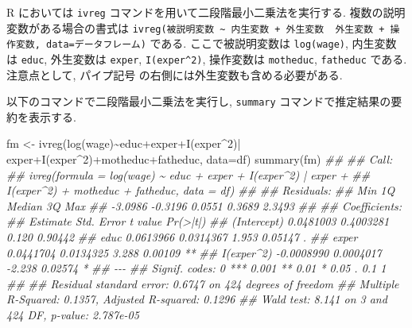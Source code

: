 \documentclass[
  letterpaper,
  xelatex,
  ja=standard, xelatex]{bxjsbook}
\newenvironment{Shaded}{\begin{snugshade}}{\end{snugshade}}
\newcommand{\AttributeTok}[1]{\textcolor[rgb]{0.40,0.45,0.13}{#1}}
\newcommand{\DecValTok}[1]{\textcolor[rgb]{0.68,0.00,0.00}{#1}}
\newcommand{\DocumentationTok}[1]{\textcolor[rgb]{0.37,0.37,0.37}{\textit{#1}}}
\newcommand{\FunctionTok}[1]{\textcolor[rgb]{0.28,0.35,0.67}{#1}}
\newcommand{\NormalTok}[1]{\textcolor[rgb]{0.00,0.23,0.31}{#1}}
\newcommand{\OtherTok}[1]{\textcolor[rgb]{0.00,0.23,0.31}{#1}}
\newcommand{\SpecialCharTok}[1]{\textcolor[rgb]{0.37,0.37,0.37}{#1}}
\begin{document}
R においては \texttt{ivreg} コマンドを用いて二段階最小二乗法を実行する.
複数の説明変数がある場合の書式は
\texttt{ivreg(被説明変数\ \textasciitilde{}\ 内生変数\ +\ 外生変数\ \textbar{}\ 外生変数\ +\ 操作変数,\ data=データフレーム)}
である. ここで被説明変数は \texttt{log(wage)}, 内生変数は \texttt{educ},
外生変数は \texttt{exper}, \texttt{I(exper\^{}2)}, 操作変数は
\texttt{motheduc}, \texttt{fatheduc} である. 注意点として, パイプ記号
\texttt{\textbar{}} の右側には外生変数も含める必要がある.

以下のコマンドで二段階最小二乗法を実行し, \texttt{summary}
コマンドで推定結果の要約を表示する.

\begin{Shaded}
\begin{Highlighting}[]
\NormalTok{fm  }\OtherTok{\textless{}{-}} \FunctionTok{ivreg}\NormalTok{(}\FunctionTok{log}\NormalTok{(wage)}\SpecialCharTok{\textasciitilde{}}\NormalTok{educ}\SpecialCharTok{+}\NormalTok{exper}\SpecialCharTok{+}\FunctionTok{I}\NormalTok{(exper}\SpecialCharTok{\^{}}\DecValTok{2}\NormalTok{)}\SpecialCharTok{|}
\NormalTok{            exper}\SpecialCharTok{+}\FunctionTok{I}\NormalTok{(exper}\SpecialCharTok{\^{}}\DecValTok{2}\NormalTok{)}\SpecialCharTok{+}\NormalTok{motheduc}\SpecialCharTok{+}\NormalTok{fatheduc,}
            \AttributeTok{data=}\NormalTok{df)}
\FunctionTok{summary}\NormalTok{(fm)}
\DocumentationTok{\#\# }
\DocumentationTok{\#\# Call:}
\DocumentationTok{\#\# ivreg(formula = log(wage) \textasciitilde{} educ + exper + I(exper\^{}2) | exper + }
\DocumentationTok{\#\#     I(exper\^{}2) + motheduc + fatheduc, data = df)}
\DocumentationTok{\#\# }
\DocumentationTok{\#\# Residuals:}
\DocumentationTok{\#\#     Min      1Q  Median      3Q     Max }
\DocumentationTok{\#\# {-}3.0986 {-}0.3196  0.0551  0.3689  2.3493 }
\DocumentationTok{\#\# }
\DocumentationTok{\#\# Coefficients:}
\DocumentationTok{\#\#               Estimate Std. Error t value Pr(\textgreater{}|t|)   }
\DocumentationTok{\#\# (Intercept)  0.0481003  0.4003281   0.120  0.90442   }
\DocumentationTok{\#\# educ         0.0613966  0.0314367   1.953  0.05147 . }
\DocumentationTok{\#\# exper        0.0441704  0.0134325   3.288  0.00109 **}
\DocumentationTok{\#\# I(exper\^{}2)  {-}0.0008990  0.0004017  {-}2.238  0.02574 * }
\DocumentationTok{\#\# {-}{-}{-}}
\DocumentationTok{\#\# Signif. codes:  0 \textquotesingle{}***\textquotesingle{} 0.001 \textquotesingle{}**\textquotesingle{} 0.01 \textquotesingle{}*\textquotesingle{} 0.05 \textquotesingle{}.\textquotesingle{} 0.1 \textquotesingle{} \textquotesingle{} 1}
\DocumentationTok{\#\# }
\DocumentationTok{\#\# Residual standard error: 0.6747 on 424 degrees of freedom}
\DocumentationTok{\#\# Multiple R{-}Squared: 0.1357,  Adjusted R{-}squared: 0.1296 }
\DocumentationTok{\#\# Wald test: 8.141 on 3 and 424 DF,  p{-}value: 2.787e{-}05}
\end{Highlighting}
\end{Shaded}
\end{document}
